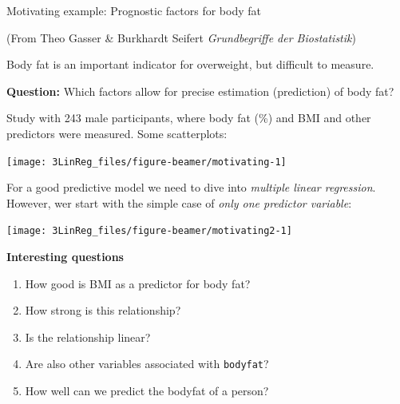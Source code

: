 \documentclass[10pt,ignorenonframetext,]{beamer}
\providecommand{\tightlist}{%
  \setlength{\itemsep}{0pt}\setlength{\parskip}{0pt}}
\begin{document}
\begin{frame}

\begin{block}{Motivating example: Prognostic factors for body fat}

\tiny(From Theo Gasser \& Burkhardt Seifert \emph{Grundbegriffe der
Biostatistik})

\vspace{2mm} \normalsize
Body fat is an important indicator for overweight, but difficult to
measure.

\vspace{2mm} \textbf{Question:} Which factors allow for precise
estimation (prediction) of body fat?

\vspace{2mm} Study with 243 male participants, where body fat (\%) and
BMI and other predictors were measured. Some scatterplots:

\begin{center}\texttt{[image: 3LinReg\_files/figure-beamer/motivating-1]} \end{center}

\end{block}

\end{frame}

\begin{frame}

For a good predictive model we need to dive into \emph{multiple linear
regression}. However, wer start with the simple case of \emph{only one
predictor variable}:

\begin{center}\texttt{[image: 3LinReg\_files/figure-beamer/motivating2-1]} \end{center}

\end{frame}

\begin{frame}[fragile]

\textbf{Interesting questions}

\begin{enumerate}
\def\labelenumi{\arabic{enumi}.}
\tightlist
\item
  How good is BMI as a predictor for body fat?
\item
  How strong is this relationship?
\item
  Is the relationship linear?
\item
  Are also other variables associated with \texttt{bodyfat}?
\item
  How well can we predict the bodyfat of a person?
\end{enumerate}

\end{frame}
\end{document}
